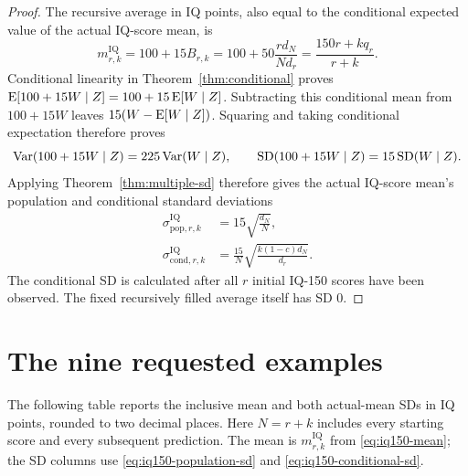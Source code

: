 \begin{proof}
The recursive average in IQ points, also equal to the conditional expected
value of the actual IQ-score mean, is
\begin{equation}
  m_{r,k}^{\mathrm{IQ}}
    =100+15B_{r,k}
    =100+50\frac{r d_N}{N d_r}
    =\frac{150r+kq_r}{r+k}.
  \label{eq:iq150-mean}
\end{equation}
Conditional linearity in Theorem~\ref{thm:conditional} proves
\(\operatorname{E}[100+15W\mid Z]=100+15\operatorname{E}[W\mid Z]\).
Subtracting this conditional mean from \(100+15W\) leaves
\(15(W-\operatorname{E}[W\mid Z])\). Squaring and taking conditional expectation
therefore proves
\[
 \operatorname{Var}(100+15W\mid Z)=225\operatorname{Var}(W\mid Z),\qquad
 \operatorname{SD}(100+15W\mid Z)=15\operatorname{SD}(W\mid Z).
\]
Applying Theorem~\ref{thm:multiple-sd} therefore gives the actual IQ-score mean's
population and conditional standard deviations
\begin{align}
  \sigma_{\mathrm{pop},r,k}^{\mathrm{IQ}}
    &=15\sqrt{\frac{d_N}{N}},
      \label{eq:iq150-population-sd}\\
  \sigma_{\mathrm{cond},r,k}^{\mathrm{IQ}}
    &=\frac{15}{N}\sqrt{\frac{k(1-c)d_N}{d_r}}.
      \label{eq:iq150-conditional-sd}
\end{align}
The conditional SD is calculated after all \(r\) initial IQ-150 scores have
been observed. The fixed recursively filled average itself has SD \(0\).
\end{proof}

\section{The nine requested examples}
The following table reports the inclusive mean and both actual-mean SDs in
IQ points, rounded to two decimal places. Here \(N=r+k\) includes every
starting score and every subsequent prediction. The mean is
\(m_{r,k}^{\mathrm{IQ}}\) from \eqref{eq:iq150-mean}; the SD columns use
\eqref{eq:iq150-population-sd} and \eqref{eq:iq150-conditional-sd}.

